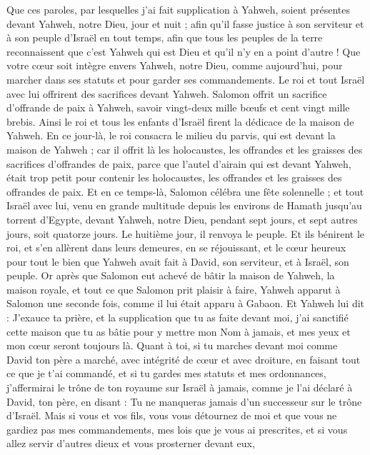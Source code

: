 \begin{multicols}{2}
Que ces paroles, par lesquelles j'ai fait supplication à Yahweh, soient présentes devant Yahweh, notre Dieu, jour et nuit ; afin qu'il fasse justice à son serviteur et à son peuple d'Israël en tout temps,
afin que tous les peuples de la terre reconnaissent que c'est Yahweh qui est Dieu et qu'il n'y en a point d'autre !
Que votre cœur soit intègre envers Yahweh, notre Dieu, comme aujourd'hui, pour marcher dans ses statuts et pour garder ses commandements.
Le roi et tout Israël avec lui offrirent des sacrifices devant Yahweh.
Salomon offrit un sacrifice d'offrande de paix à Yahweh, savoir vingt-deux mille bœufs et cent vingt mille brebis. Ainsi le roi et tous les enfants d'Israël firent la dédicace de la maison de Yahweh.
En ce jour-là, le roi consacra le milieu du parvis, qui est devant la maison de Yahweh ; car il offrit là les holocaustes, les offrandes et les graisses des sacrifices d'offrandes de paix, parce que l'autel d'airain qui est devant Yahweh, était trop petit pour contenir les holocaustes, les offrandes et les graisses des offrandes de paix.
Et en ce temps-là, Salomon célébra une fête solennelle ; et tout Israël avec lui, venu en grande multitude depuis les environs de Hamath jusqu'au torrent d'Egypte, devant Yahweh, notre Dieu, pendant sept jours, et sept autres jours, soit quatorze jours.
Le huitième jour, il renvoya le peuple. Et ils bénirent le roi, et s'en allèrent dans leurs demeures, en se réjouissant, et le cœur heureux pour tout le bien que Yahweh avait fait à David, son serviteur, et à Israël, son peuple.
\VerseOne{}Or après que Salomon eut achevé de bâtir la maison de Yahweh, la maison royale, et tout ce que Salomon prit plaisir à faire,
Yahweh apparut à Salomon une seconde fois, comme il lui était apparu à Gabaon.
Et Yahweh lui dit : J'exauce ta prière, et la supplication que tu as faite devant moi, j'ai sanctifié cette maison que tu as bâtie pour y mettre mon Nom à jamais, et mes yeux et mon cœur seront toujours là.
Quant à toi, si tu marches devant moi comme David ton père a marché, avec intégrité de cœur et avec droiture, en faisant tout ce que je t'ai commandé, et si tu gardes mes statuts et mes ordonnances,
j'affermirai le trône de ton royaume sur Israël à jamais, comme je l'ai déclaré à David, ton père, en disant : Tu ne manqueras jamais d'un successeur sur le trône d'Israël.
Mais si vous et vos fils, vous vous détournez de moi et que vous ne gardiez pas mes commandements, mes lois que je vous ai prescrites, et si vous allez servir d'autres dieux et vous prosterner devant eux,

\end{multicols}

